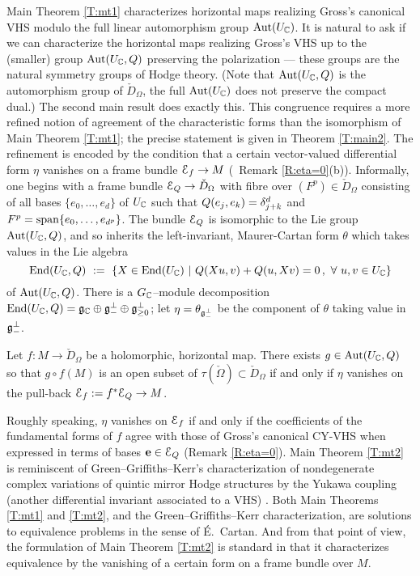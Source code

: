 \documentclass[12pt]{amsart}
\numberwithin{equation}{section}
\numberwithin{table}{section}
\numberwithin{figure}{section}
\begin{document}
Main Theorem \ref{T:mt1} characterizes horizontal maps realizing Gross's canonical VHS modulo the full linear automorphism group $\mathrm{Aut}(U_\mathbb C)$.  It is natural to ask if we can characterize the horizontal maps realizing Gross's VHS up to the (smaller)  group $\mathrm{Aut}(U_\mathbb C,Q)$ preserving the polarization --- these groups are the natural symmetry groups of Hodge theory.  (Note that $\mathrm{Aut}(U_\mathbb C,Q)$ is the automorphism group of $\check D_\Omega$, the full $\mathrm{Aut}(U_\mathbb C)$ does not preserve the compact dual.)  The second main result does exactly this.  This congruence requires a more refined notion of agreement of the characteristic forms than the isomorphism of Main Theorem \ref{T:mt1}; the precise statement is given in Theorem \ref{T:main2}.  The refinement is encoded by the condition that a certain vector-valued differential form $\eta$ vanishes on a frame bundle $\mathcal E_f \to M$ (\cf~Remark \ref{R:eta=0}(b)).  Informally, one begins with a frame bundle $\mathcal E_Q \to \check D_\Omega$ with fibre over $(F^p) \in \check D_\Omega$ consisting of all bases $\{e_0 , \ldots , e_d\}$ of $U_\mathbb C$ such that $Q(e_j,e_k) = \delta_{j+k}^{d}$ and $F^p = \mathrm{span}\{ e_0 , \ldots , e_{d^p} \}$.  The bundle $\mathcal E_Q$ is isomorphic to the Lie group $\mathrm{Aut}(U_\mathbb C,Q)$, and so inherits the left-invariant, Maurer-Cartan form $\theta$ which takes values in the Lie algebra
\[
  \tEnd(U_\bC,Q) \ := \ \{ X \in \tEnd(U_\bC) \ | \ Q(Xu,v) + Q(u,Xv) = 0 \,,\
  \forall \ u,v \in U_\bC\}
\]
of $\mathrm{Aut}(U_\mathbb C,Q)$.  There is a $G_\mathbb C$--module decomposition $\mathrm{End}(U_\mathbb C,Q) = {\mathfrak{g}}_\mathbb C \oplus {\mathfrak{g}}^\perp_- \oplus {\mathfrak{g}}^\perp_{\ge0}$; let $\eta = \theta_{{\mathfrak{g}}^\perp_-}$ be the component of $\theta$ taking value in ${\mathfrak{g}}_-^\perp$.     

\begin{mainthm} \label{T:mt2}
Let $f : M \to \check D_\Omega$ be a holomorphic, horizontal map.  There exists $g \in \mathrm{Aut}(U_\mathbb C,Q)$ so that $g \circ f(M)$ is an open subset of $\tau(\check\Omega)\subset \check D_\Omega$ if and only if $\eta$ vanishes on the pull-back $\mathcal E_f := f^*\mathcal E_Q \to M$.
\end{mainthm}

\noindent Roughly speaking, $\eta$ vanishes on $\mathcal E_f$ if and only if the coefficients of the fundamental forms of $f$ agree with those of Gross's canonical CY-VHS when expressed in terms of bases $\mathbf{e} \in \mathcal E_Q$ (Remark \ref{R:eta=0}).   Main Theorem \ref{T:mt2} is reminiscent of Green--Griffiths--Kerr's characterization of nondegenerate complex variations of quintic mirror Hodge structures by the Yukawa coupling (another differential invariant associated to a VHS) \cite[\S IV]{MR2457736}.   Both Main Theorems \ref{T:mt1} and \ref{T:mt2}, and the Green--Griffiths--Kerr characterization, are solutions to equivalence problems in the sense of \'E.~Cartan.  And from that point of view, the formulation of Main Theorem \ref{T:mt2} is standard in that it characterizes equivalence by the vanishing of a certain form on a frame bundle over $M$.
\end{document}
